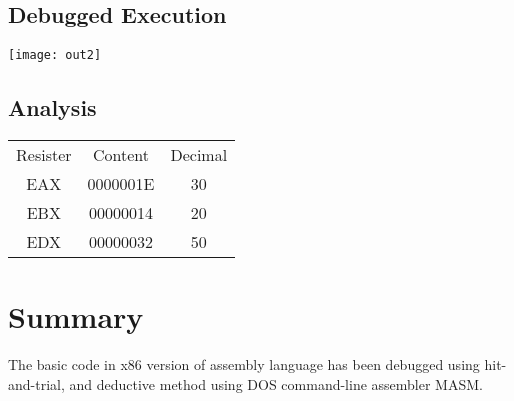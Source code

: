 \documentclass{article}
\begin{document}
\subsection{Debugged Execution}
\texttt{[image: out2]}
\subsection{Analysis}
\begin{center}
\begin{tabular}{c c c}
	Resister & Content & Decimal\\
	EAX & 0000001E & 30 \\
	EBX & 00000014 & 20 \\
	EDX & 00000032 & 50
\end{tabular}
\end{center}
\section{Summary}
The basic code in x86 version of assembly language has been debugged using hit-and-trial, and deductive method using DOS command-line assembler MASM.
\end{document}
